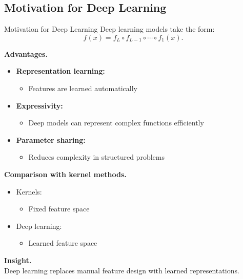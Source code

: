 \documentclass[aspectratio=169,11pt]{beamer}
\begin{document}
\subsection{Motivation for Deep Learning}
\begin{frame}[t,allowframebreaks]{Motivation for Deep Learning}
\small
Deep learning models take the form:
\[
f(x) = f_L \circ f_{L-1} \circ \cdots \circ f_1(x).
\]

\textbf{Advantages.}\\ \begin{itemize}
    \item \textbf{Representation learning:}\\ \begin{itemize}
        \item Features are learned automatically
    \end{itemize}

    \item \textbf{Expressivity:}\\ \begin{itemize}
        \item Deep models can represent complex functions efficiently
    \end{itemize}

    \item \textbf{Parameter sharing:}\\ \begin{itemize}
        \item Reduces complexity in structured problems
    \end{itemize}
\end{itemize}

\textbf{Comparison with kernel methods.}\\ \begin{itemize}
    \item Kernels:
    \begin{itemize}
        \item Fixed feature space
    \end{itemize}

    \item Deep learning:
    \begin{itemize}
        \item Learned feature space
    \end{itemize}
\end{itemize}

\textbf{Insight.}\\ Deep learning replaces manual feature design with learned representations.
\end{frame}
\end{document}
